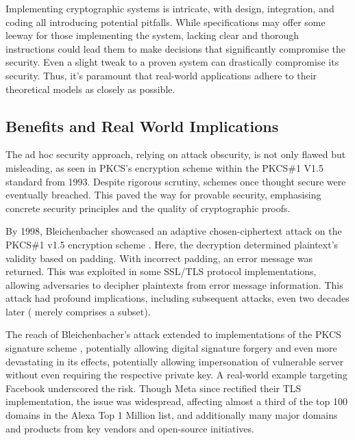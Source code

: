 \documentclass[]{final_report}
\theoremstyle{definition}
\begin{document}
Implementing cryptographic systems is intricate, with design, integration, and coding all introducing potential pitfalls. While specifications may offer some leeway for those implementing the system, lacking clear and thorough instructions could lead them to make decisions that significantly compromise the security. Even a slight tweak to a proven system can drastically compromise its security. Thus, it's paramount that real-world applications adhere to their theoretical models as closely as possible.


\subsection{Benefits and Real World Implications}
The ad hoc security approach, relying on attack obscurity, is not only flawed but misleading, as seen in PKCS's encryption scheme within the PKCS\#1 V1.5 standard from 1993. Despite rigorous scrutiny, schemes once thought secure were eventually breached. This paved the way for provable security, emphasising concrete security principles and the quality of cryptographic proofs.

By 1998, Bleichenbacher showcased an adaptive chosen-ciphertext attack on the PKCS\#1 v1.5 encryption scheme \cite{bleichenbacher1998chosen}. Here, the decryption determined plaintext's validity based on padding. With incorrect padding, an error message was returned. This was exploited in some SSL/TLS protocol implementations, allowing adversaries to decipher plaintexts from error message information. This attack had profound implications, including subsequent attacks, even two decades later (\cite{coppersmith1996low, coron2000new, 10.1007/978-3-540-45238-6_33, degabriele2012joint, bardou2012efficient, meyer2014revisiting, zhang2014cross, jager2015security, jager2015practical, bock2018return} merely comprises a subset).

The reach of Bleichenbacher's attack extended to implementations of the PKCS signature scheme \cite{finney2006bleichenbacher, kuhn2008variants}, potentially allowing digital signature forgery and even more devastating in its effects, potentially allowing impersonation of vulnerable server without even requiring the respective private key. A real-world example targeting Facebook  \cite{bock2018return} underscored the risk. Though Meta since rectified their TLS implementation, the issue was widespread, affecting almost a third of the top 100 domains in the Alexa Top 1 Million list, and additionally many major domains and products from key vendors and open-source initiatives.
\end{document}
